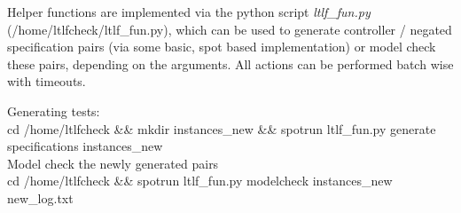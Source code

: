 \documentclass[11pt]{article}
\begin{document}
Helper functions are implemented via the python script
\textit{ltlf\_fun.py} \\
(/home/ltlfcheck/ltlf\_fun.py), which can be used to
generate controller / negated specification pairs (via some basic,
spot based implementation) or model check these pairs, depending on the arguments.
All actions can be performed batch wise with timeouts.


Generating tests:\\
cd /home/ltlfcheck \&\& mkdir instances\_new \&\& spotrun ltlf\_fun.py generate specifications instances\_new  \\[6pt]

Model check the newly generated pairs\\
cd /home/ltlfcheck \&\& spotrun ltlf\_fun.py modelcheck instances\_new new\_log.txt
\end{document}
